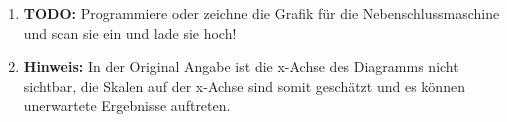 \begin{solution}
\begin{enumerate}
	\item \textbf{TODO:} Programmiere oder zeichne die Grafik für die Nebenschlussmaschine und scan sie ein und lade sie hoch!
\item \textbf{Hinweis:} In der Original Angabe ist die x-Achse des Diagramms nicht sichtbar, die Skalen auf der x-Achse sind somit geschätzt und es können unerwartete Ergebnisse auftreten.
\end{enumerate}
\end{solution}
